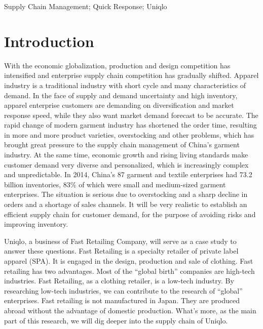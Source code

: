 \documentclass[12pt,a4paper]{article}
\begin{document}
Supply Chain Management; Quick Response; Uniqlo

\normalsize

\newpage

\tableofcontents

\newpage

\hypertarget{introduction}{%
\section{Introduction}\label{introduction}}

With the economic globalization, production and design competition has
intensified and enterprise supply chain competition has gradually
shifted. Apparel industry is a traditional industry with short cycle and
many characteristics of demand. In the face of supply and demand
uncertainty and high inventory, apparel enterprise customers are
demanding on diversification and market response speed, while they also
want market demand forecast to be accurate. The rapid change of modern
garment industry has shortened the order time, resulting in more and
more product varieties, overstocking and other problems, which has
brought great pressure to the supply chain management of China's garment
industry. At the same time, economic growth and rising living standards
make customer demand very diverse and personalized, which is
increasingly complex and unpredictable. In 2014, China's 87 garment and
textile enterprises had 73.2 billion inventories, 83\% of which were
small and medium-sized garment enterprises. The situation is serious due
to overstocking and a sharp decline in orders and a shortage of sales
channels. It will be very realistic to establish an efficient supply
chain for customer demand, for the purpose of avoiding risks and
improving inventory.

Uniqlo, a business of Fast Retailing Company, will serve as a case study
to answer these questions. Fast Retailing is a specialty retailer of
private label apparel (SPA). It is engaged in the design, production and
sale of clothing. Fast retailing has two advantages. Most of the
``global birth'' companies are high-tech industries. Fast Retailing, as
a clothing retailer, is a low-tech industry. By researching low-tech
industries, we can contribute to the research of ``global'' enterprises.
Fast retailing is not manufactured in Japan. They are produced abroad
without the advantage of domestic production. What's more, as the main
part of this research, we will dig deeper into the supply chain of
Uniqlo.
\end{document}
